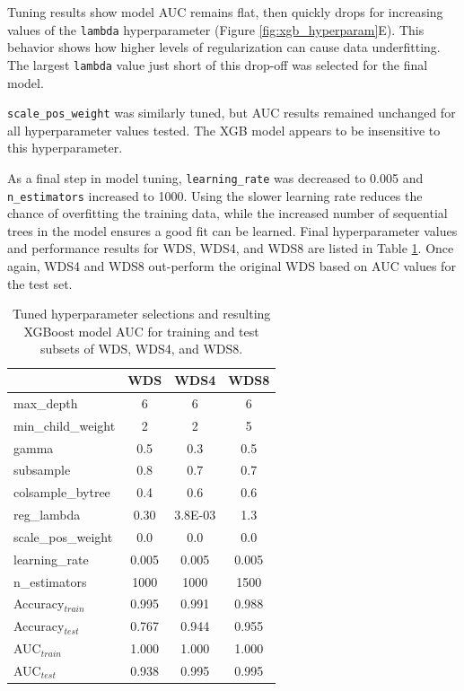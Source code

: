 Tuning results show model AUC remains flat, then quickly drops for increasing values of the \verb|lambda| hyperparameter (Figure \ref{fig:xgb_hyperparam}E). This behavior shows how higher levels of regularization can cause data underfitting. The largest \verb|lambda| value just short of this drop-off was selected for the final model.

\verb|scale_pos_weight| was similarly tuned, but AUC results remained unchanged for all hyperparameter values tested. The XGB model appears to be insensitive to this hyperparameter.

As a final step in model tuning, \verb|learning_rate| was decreased to 0.005 and \verb|n_estimators| increased to 1000.  Using the slower learning rate reduces the chance of overfitting the training data, while the increased number of sequential trees in the model ensures a good fit can be learned. 
Final hyperparameter values and performance results for WDS, WDS4, and WDS8 are listed in Table \ref{tab:xgb_tuning}. Once again, WDS4 and WDS8 out-perform the original WDS based on AUC values for the test set.

\begin{table}[!htp]
    \centering
    \begin{tabular}{l|c|c|c|}
    \cline{2-4}
                                             & WDS   & WDS4    & WDS8  \\ \hline
    \multicolumn{1}{|l|}{max\_depth}         & 6     & 6       & 6     \\ \hline
    \multicolumn{1}{|l|}{min\_child\_weight} & 2     & 2       & 5     \\ \hline
    \multicolumn{1}{|l|}{gamma}              & 0.5   & 0.3     & 0.5   \\ \hline
    \multicolumn{1}{|l|}{subsample}          & 0.8   & 0.7     & 0.7   \\ \hline
    \multicolumn{1}{|l|}{colsample\_bytree}  & 0.4   & 0.6     & 0.6   \\ \hline
    \multicolumn{1}{|l|}{reg\_lambda}        & 0.30  & 3.8E-03 & 1.3   \\ \hline
    \multicolumn{1}{|l|}{scale\_pos\_weight} & 0.0   & 0.0     & 0.0   \\ \hline
    \multicolumn{1}{|l|}{learning\_rate}     & 0.005 & 0.005   & 0.005 \\ \hline
    \multicolumn{1}{|l|}{n\_estimators}      & 1000  & 1000    & 1500  \\ \hline
    \multicolumn{1}{|l|}{Accuracy$_{train}$} & 0.995 & 0.991   & 0.988 \\ \hline
    \multicolumn{1}{|l|}{Accuracy$_{test}$}  & 0.767 & 0.944   & 0.955 \\ \hline
    \multicolumn{1}{|l|}{AUC$_{train}$}      & 1.000 & 1.000   & 1.000 \\ \hline
    \multicolumn{1}{|l|}{AUC$_{test}$}       & 0.938 & 0.995   & 0.995 \\ \hline
    \end{tabular}
    \caption[XGBoost hyperparameter values]{Tuned hyperparameter selections and resulting XGBoost model AUC for training and test subsets of WDS, WDS4, and WDS8.}
    \label{tab:xgb_tuning}
\end{table}

